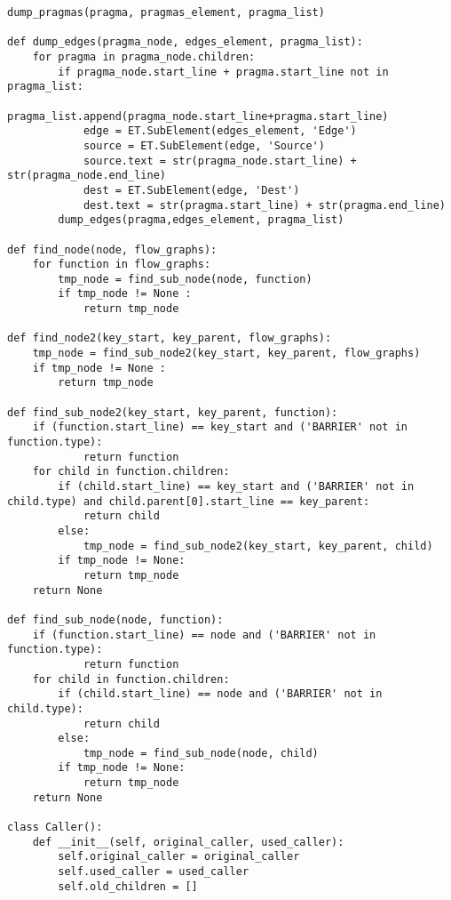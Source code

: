 \documentclass[a4paper,11pt,twoside]{book}
\begin{document}
\begin{lstlisting}[language=CCC, caption=pargraph.py]
		dump_pragmas(pragma, pragmas_element, pragma_list)

def dump_edges(pragma_node, edges_element, pragma_list):
	for pragma in pragma_node.children:
		if pragma_node.start_line + pragma.start_line not in pragma_list:
			pragma_list.append(pragma_node.start_line+pragma.start_line)
			edge = ET.SubElement(edges_element, 'Edge')
			source = ET.SubElement(edge, 'Source')
			source.text = str(pragma_node.start_line) + str(pragma_node.end_line)
			dest = ET.SubElement(edge, 'Dest')
			dest.text = str(pragma.start_line) + str(pragma.end_line)
		dump_edges(pragma,edges_element, pragma_list)

def find_node(node, flow_graphs):
	for function in flow_graphs:
		tmp_node = find_sub_node(node, function) 
		if tmp_node != None :
			return tmp_node

def find_node2(key_start, key_parent, flow_graphs):
	tmp_node = find_sub_node2(key_start, key_parent, flow_graphs) 
	if tmp_node != None :
		return tmp_node

def find_sub_node2(key_start, key_parent, function):
	if (function.start_line) == key_start and ('BARRIER' not in function.type):
			return function
	for child in function.children:
		if (child.start_line) == key_start and ('BARRIER' not in child.type) and child.parent[0].start_line == key_parent:
			return child
		else:
			tmp_node = find_sub_node2(key_start, key_parent, child)
		if tmp_node != None:
			return tmp_node
	return None

def find_sub_node(node, function):
	if (function.start_line) == node and ('BARRIER' not in function.type):
			return function
	for child in function.children:
		if (child.start_line) == node and ('BARRIER' not in child.type):
			return child
		else:
			tmp_node = find_sub_node(node, child)
		if tmp_node != None:
			return tmp_node
	return None

class Caller():
	def __init__(self, original_caller, used_caller):
		self.original_caller = original_caller
		self.used_caller = used_caller
		self.old_children = []


\end{lstlisting}
\end{document}
